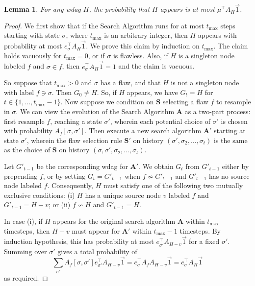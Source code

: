 \documentclass[11pt]{article}
\newtheorem{lemma}[theorem]{Lemma}
\begin{document}
\begin{lemma}
  \label{witness-tree-lemma_simple}
For any wdag $H$, the probability that $H$ appears is at most $\mu^{\top} A_H \vec 1$.
\end{lemma}
\begin{proof}
We first show that if the Search Algorithm runs for at most $t_{\max}$ steps starting with state $\sigma$, where $t_{\max}$ is an arbitrary integer, then $H$ appears with probability at most $e_{\sigma}^{\top} A_H \vec 1.$ We prove this claim by induction on $t_{\max}$.  The claim holds vacuously for $t_{\max} = 0$, or if $\sigma$ is flawless. Also, if $H$ is a singleton node labeled $f$ and $\sigma \in f$, then $e_{\sigma}^{\top} A_H \vec 1 = 1$ and the claim is vacuous.  

So suppose that $t_{\max} > 0$ and $\sigma$ has a flaw, and that $H$ is not a singleton node with label $f \ni \sigma$.  Then $G_0 \neq H$. So, if $H$ appears,  we have $G_t = H$ for  $t  \in \{1, \dots,  t_{\max} -1 \}$. Now suppose we condition on $\mathbf S$ selecting a flaw $f$ to resample in $\sigma$.  We can view the evolution of the Search Algorithm $\mathbf A$ as a two-part process: first resample $f$, reaching a state $\sigma'$, wherein each potential choice of $\sigma'$ is chosen with probability $A_f[\sigma, \sigma']$. Then execute a new search algorithm $\mathbf A'$ starting at state $\sigma'$, wherein the flaw selection rule $\mathbf S'$ on history $(\sigma', \sigma_2,  \dots, \sigma_t)$ is the same as the choice of $\mathbf S$ on history $(\sigma, \sigma', \sigma_2, \dots, \sigma_t)$.   

 Let $G'_{t-1}$ be the corresponding wdag for $\mathbf A'$. We obtain $G_t$ from $G'_{t-1}$ either by prepending $f$, or by setting $G_t = G'_{t-1}$ when $f \not \sim G'_{t-1}$ and $G'_{t-1}$ has no source node labeled $f$. Consequently, $H$ must satisfy one of the following two mutually exclusive conditions: (i) $H$ has a unique source node $v$ labeled $f$ and $G'_{t-1} = H - v$; or  (ii) $f \not \sim H$ and  $G'_{t-1} = H$.

In case (i), if $H$ appears for the original search algorithm $\mathbf A$ within $t_{\max}$ timesteps, then   $H-v$ must appear for $\mathbf A'$ within $t_{\max}-1$ timesteps. By induction hypothesis, this has  probability at most $e_{\sigma'}^{\top} A_{H-v} \vec 1$ for a fixed $\sigma'$. Summing over $\sigma'$ gives a total probability of 
$$
\sum_{\sigma'} A_f[\sigma, \sigma'] e_{\sigma'}^{\top} A_{H-v} \vec 1 = e_{\sigma}^{\top} A_f  A_{H-v} \vec 1 = e_{\sigma}^{\top} A_H \vec 1
$$
as required.


\end{proof}
\end{document}
